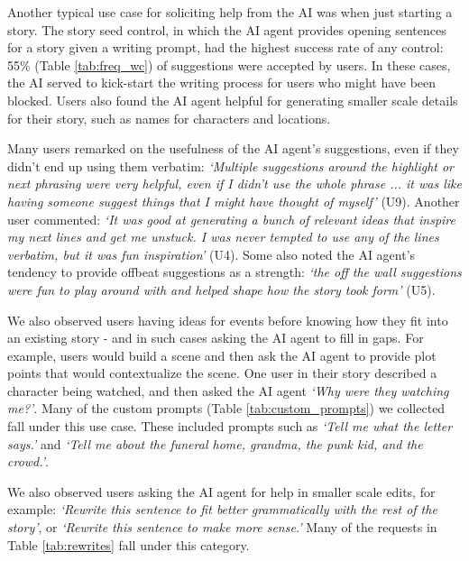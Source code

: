 Another typical use case for soliciting help from the AI was when just starting a story.
The story seed control, in which the AI agent provides opening sentences for a story given a writing prompt, had the highest success rate of any control: 55\% (Table \ref{tab:freq_wc}) of suggestions were accepted by users.
In these cases, the AI served to kick-start the writing process for users who might have been blocked.
Users also found the AI agent helpful for generating smaller scale details for their story, such as names for characters and locations.

Many users remarked on the usefulness of the AI agent's suggestions, even if they didn't end up using them verbatim: \textit{`Multiple suggestions around the highlight or next phrasing were very helpful, even if I didn't use the whole phrase ... it was like having someone suggest things that I might have thought of myself'} (U9).
Another user commented: \textit{`It was good at generating a bunch of relevant ideas that inspire my next lines and get me unstuck. I was never tempted to use any of the lines verbatim, but it was fun inspiration'} (U4).
Some also noted the AI agent's tendency to provide offbeat suggestions as a strength: \textit{`the off the wall suggestions were fun to play around with and helped shape how the story took form'} (U5).

We also observed users having ideas for events before knowing how they fit into an existing story - and in such cases asking the AI agent to fill in gaps.
For example, users would build a scene and then ask the AI agent to provide plot points that would contextualize the scene. 
One user in their story described a character being watched, and then asked the AI agent \textit{`Why were they watching me?'}. 
Many of the custom prompts (Table \ref{tab:custom_prompts}) we collected fall under this use case. 
These included prompts such as \textit{`Tell me what the letter says.'} and \textit{`Tell me about the funeral home, grandma, the punk kid, and the crowd.'}.

We also observed users asking the AI agent for help in smaller scale edits, for example: \textit{`Rewrite this sentence to fit better grammatically with the rest of the story'}, or \textit{`Rewrite this sentence to make more sense.'} 
Many of the requests in Table \ref{tab:rewrites} fall under this category. 


